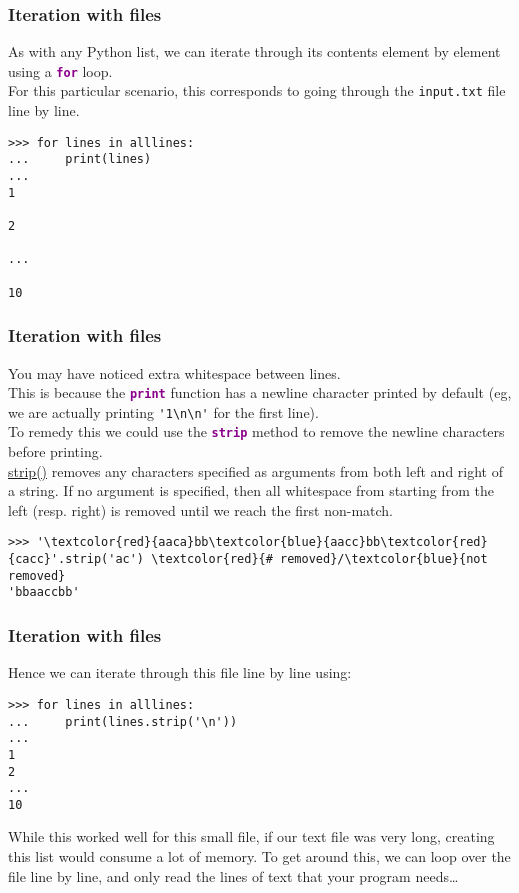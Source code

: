 \documentclass[xcolor=svgnames]{beamer}
\newcommand{\nl}{\\[1em]}
\newcommand{\command}[1]{\texttt{\textbf{\textcolor{DarkMagenta}{#1}}}}
\newcommand{\ft}[1]{\frametitle{#1}}
\begin{document}
\begin{frame}[fragile]\ft{Iteration with files}
As with any Python list, we can iterate through its contents element by element  using a \command{for} loop.  \nl

For this particular scenario, this corresponds to going through the {\tt input.txt} file line by line.\nl
\begin{Verbatim}[xleftmargin=.5in, frame=single]
>>> for lines in alllines:
...     print(lines)
... 
1

2

...

10
\end{Verbatim}
\vfill
\end{frame}

\begin{frame}[fragile]\ft{Iteration with files}
You may have noticed  extra whitespace between lines.\nl
This is because the  \command{print} function has a newline character printed by default (eg, we are actually printing \verb|'1\n\n'| for the first line).\nl
To remedy this we could use the {\command{strip}} method to remove the newline characters before printing.\nl
\href{https://www.geeksforgeeks.org/python-string-strip-2/}{strip()} removes any characters specified as arguments from both left and right of a string.  If no argument is specified, then all whitespace from starting from the left (resp. right) is removed until we reach the first non-match.
\begin{Verbatim}[frame=single, fontsize=\small, commandchars=\\\{\}]
>>> '\textcolor{red}{aaca}bb\textcolor{blue}{aacc}bb\textcolor{red}{cacc}'.strip('ac') \textcolor{red}{# removed}/\textcolor{blue}{not removed}
'bbaaccbb'
\end{Verbatim}
\end{frame}

\begin{frame}[fragile]\ft{Iteration with files}
Hence we can iterate through this file line by line using:
\begin{Verbatim}[xleftmargin=.5in, frame=single]
>>> for lines in alllines:
...     print(lines.strip('\n'))
... 
1
2
...
10
\end{Verbatim}
\vfill
While this worked well for this small file, if our text file was very long, creating this list would consume a lot of memory.  
\vfill
To get around this, we can loop over the file line by line, and only read the lines of text that your program needs\dots
\end{frame}
\end{document}
